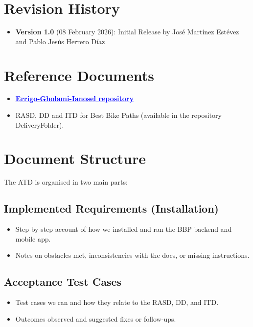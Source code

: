 \section{Revision History}
\label{sec:revision_history}

\begin{itemize}
    \item \textbf{Version 1.0} (08 February 2026): Initial Release by Jos\'e Mart\'inez Est\'evez and Pablo Jes\'us Herrero D\'iaz
\end{itemize}

\section{Reference Documents}
\label{sec:reference_documents}%
\begin{itemize}
    \item \href{https://github.com/BIA3IA/Errigo-Gholami-Ianosel}{\textbf{\textcolor{blue}{\underline{Errigo-Gholami-Ianosel repository}}}}
    \item RASD, DD and ITD for Best Bike Paths (available in the repository DeliveryFolder).
\end{itemize}

\section{Document Structure}
\label{sec:document_structure}%
The ATD is organised in two main parts:

\subsection*{Implemented Requirements (Installation)}
\begin{itemize}
    \item Step-by-step account of how we installed and ran the BBP backend and mobile app.
    \item Notes on obstacles met, inconsistencies with the docs, or missing instructions.
\end{itemize}

\subsection*{Acceptance Test Cases}
\begin{itemize}
    \item Test cases we ran and how they relate to the RASD, DD, and ITD.
    \item Outcomes observed and suggested fixes or follow-ups.
\end{itemize}
